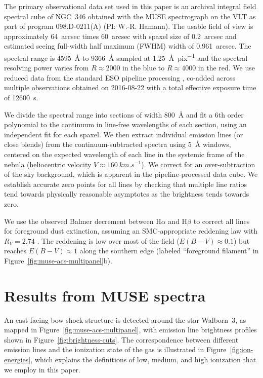 \documentclass[twocolumn, times]{aastex631}
\newcommand\ha{\ensuremath{\text{H}\alpha}}
\newcommand\hb{\ensuremath{\text{H}\beta}}
\begin{document}
The primary observational data set used in this paper
is an archival integral field spectral cube of NGC~346
obtained with the MUSE spectrograph \citep{Bacon:2010a, Bacon:2014a}
on the VLT as part of program 098.D-0211(A) (PI:  W.-R. Hamann). 
The usable field of view is approximately
\SI{64}{arcsec} times \SI{60}{arcsec} with
spaxel size of \SI{0.2}{arcsec} and estimated seeing
full-width half maximum (FWHM) width of \SI{0.961}{arcsec}.
The spectral range is \SI{4595}{\angstrom} to \SI{9366}{\angstrom}
sampled at \SI{1.25}{\angstrom.pix^{-1}} and the
spectral resolving power varies from \(R \approx 2000\) in the blue
to \(R \approx 4000\) in the red.
We use reduced data from the standard ESO pipeline processing
\citep{Weilbacher:2020a},
co-added across multiple observations obtained on \mbox{2016-08-22}
with a total effective exposure time of \SI{12600}{s}.

We divide the spectral range into sections of width \SI{800}{\angstrom}
and fit a 6th order polynomial to the continuum
in line-free wavelengths of each section,
using an independent fit for each spaxel.
We then extract individual emission lines (or close blends)
from the continuum-subtracted spectra using \SI{5}{\angstrom} windows,
centered on the expected wavelength of each line
in the systemic frame of the nebula
(heliocentric velocity \(V \approx \SI{+160}{km.s^{-1}}\)).
We correct for an over-subtraction of the sky background,
which is apparent in the pipeline-processed data cube.
We establish accurate zero points for all lines by checking that
multiple line ratios tend towards physically reasonable asymptotes
as the brightness tends towards zero.

We use the observed Balmer decrement between \ha{} and \hb{} to
correct all lines for foreground dust extinction, assuming
an SMC-appropriate reddening law with \(R_V = 2.74\)
\citep{Fitzpatrick:1990a, Gordon:2003l}.
The reddening is low over most of the field
(\(E(B - V) \approx 0.1\))
but reaches \(E(B - V) \approx 1\) along the southern edge
(labeled ``foreground filament'' in
Figure~\ref{fig:muse-acs-multipanel}b).


\section{Results from MUSE spectra}
\label{sec:results}
An east-facing bow shock structure is detected
around the star Walborn~3,
as mapped in Figure~\ref{fig:muse-acs-multipanel},
with emission line brightness profiles shown in
Figure~\ref{fig:brightness-cuts}.
The correspondence between different emission lines
and the ionization state of the gas is illustrated
in Figure~\ref{fig:ion-energies},
which explains the definitions of low, medium, and
high ionization that we employ in this paper.
\end{document}
